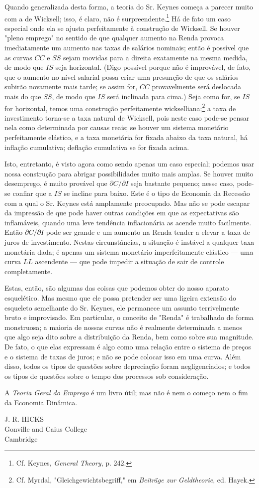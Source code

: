 \documentclass[12pt]{article}
\begin{document}
Quando generalizada desta forma, a teoria do Sr. Keynes começa a parecer muito com a de Wicksell; isso, é claro, não é surpreendente.\footnote{Cf. Keynes, \textit{General Theory}, p. 242.} Há de fato um caso especial onde ela se ajusta perfeitamente à construção de Wicksell. Se houver "pleno emprego" no sentido de que qualquer aumento na Renda provoca imediatamente um aumento nas taxas de salários nominais; então é possível que as curvas $CC$ e $SS$ sejam movidas para a direita exatamente na mesma medida, de modo que $IS$ seja horizontal. (Digo possível porque não é improvável, de fato, que o aumento no nível salarial possa criar uma presunção de que os salários subirão novamente mais tarde; se assim for, $CC$ provavelmente será deslocada mais do que $SS$, de modo que $IS$ será inclinada para cima.) Seja como for, se $IS$ for horizontal, temos uma construção perfeitamente wickselliana;\footnote{Cf. Myrdal, "Gleichgewichtsbegriff," em \textit{Beiträge zur Geldtheorie}, ed. Hayek.} a taxa de investimento torna-se a taxa natural de Wicksell, pois neste caso pode-se pensar nela como determinada por causas reais; se houver um sistema monetário perfeitamente elástico, e a taxa monetária for fixada abaixo da taxa natural, há inflação cumulativa; deflação cumulativa se for fixada acima.

Isto, entretanto, é visto agora como sendo apenas um caso especial; podemos usar nossa construção para abrigar possibilidades muito mais amplas. Se houver muito desemprego, é muito provável que $\partial C / \partial I$ seja bastante pequeno; nesse caso, pode-se confiar que a $IS$ se incline para baixo. Este é o tipo de Economia da Recessão com a qual o Sr. Keynes está amplamente preocupado. Mas não se pode escapar da impressão de que pode haver outras condições em que as expectativas são inflamáveis, quando uma leve tendência inflacionária as acende muito facilmente. Então $\partial C / \partial I$ pode ser grande e um aumento na Renda tender a elevar a taxa de juros de investimento. Nestas circunstâncias, a situação é instável a qualquer taxa monetária dada; é apenas um sistema monetário imperfeitamente elástico — uma curva $LL$ ascendente — que pode impedir a situação de sair de controle completamente.

Estas, então, são algumas das coisas que podemos obter do nosso aparato esquelético. Mas mesmo que ele possa pretender ser uma ligeira extensão do esqueleto semelhante do Sr. Keynes, ele permanece um assunto terrivelmente bruto e improvisado. Em particular, o conceito de "Renda" é trabalhado de forma monstruosa; a maioria de nossas curvas não é realmente determinada a menos que algo seja dito sobre a distribuição da Renda, bem como sobre sua magnitude. De fato, o que elas expressam é algo como uma relação entre o sistema de preços e o sistema de taxas de juros; e não se pode colocar isso em uma curva. Além disso, todos os tipos de questões sobre depreciação foram negligenciados; e todos os tipos de questões sobre o tempo dos processos sob consideração.

A \textit{Teoria Geral do Emprego} é um livro útil; mas não é nem o começo nem o fim da Economia Dinâmica.

\begin{flushright}
J. R. HICKS \\
Gonville and Caius College \\
Cambridge
\end{flushright}
\end{document}
